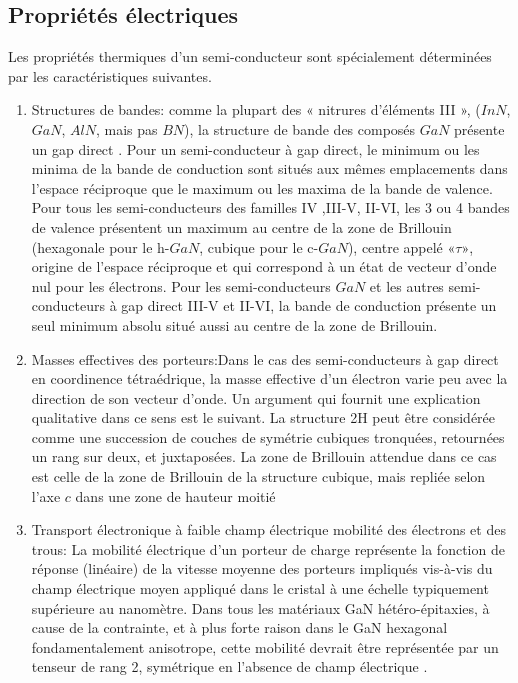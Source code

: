 \subsection{ Propriétés électriques}
Les propriétés thermiques d'un semi-conducteur sont spécialement déterminées par les
caractéristiques suivantes.

\begin{enumerate}
	\item Structures de bandes: comme la plupart des « nitrures d’éléments III », ($ InN $, $ GaN $, $ AlN $, mais pas $ BN $), la structure de bande des composés $ GaN $ présente un gap direct \cite{a15}. Pour un semi-conducteur à gap direct, le minimum ou les minima de la bande de conduction sont situés aux mêmes emplacements dans l’espace réciproque que le maximum ou les maxima de la bande de valence. Pour tous les semi-conducteurs des familles   IV ,III-V, II-VI, les 3 ou 4 bandes de valence présentent un maximum au centre de la zone de Brillouin (hexagonale pour le h-$ GaN $, cubique pour le c-$ GaN $), centre appelé $ « \tau » $, origine de l’espace réciproque et qui correspond à un état de vecteur d’onde nul pour les électrons. Pour les semi-conducteurs $ GaN $ et les autres semi-conducteurs à gap direct III-V et II-VI, la bande de conduction présente un seul minimum absolu situé aussi au centre de la zone de Brillouin.
	\item Masses effectives des porteurs:Dans le cas des semi-conducteurs à gap direct en coordinence tétraédrique, la masse effective d’un électron varie peu avec la direction de son vecteur d’onde. Un argument qui fournit une explication qualitative dans ce sens est le suivant. La structure 2H peut être considérée comme une succession de couches de symétrie cubiques tronquées, retournées un rang sur deux, et juxtaposées. La zone de Brillouin attendue dans ce cas est celle de la zone de Brillouin de la structure cubique, mais repliée selon l’axe  $ c $  dans une zone de hauteur moitié
	\item Transport électronique à faible champ électrique  mobilité des électrons et des trous: La mobilité électrique d’un porteur de charge représente la fonction de réponse (linéaire) de la vitesse moyenne des porteurs impliqués vis-à-vis du champ électrique moyen appliqué dans le cristal à une échelle typiquement supérieure au nanomètre. 
	Dans tous les matériaux GaN hétéro-épitaxies, à cause de la contrainte, et à plus forte raison dans le GaN hexagonal fondamentalement anisotrope, cette mobilité devrait être représentée par un tenseur de rang 2, symétrique en l’absence de champ électrique \cite{a13}.
 
\end{enumerate}



